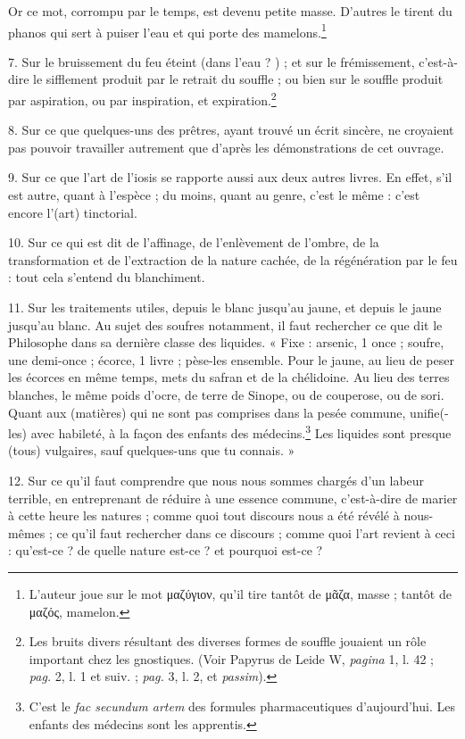 \documentclass[a4paper, 11pt, oneside, polutonikogreek, french]{article}
\begin{document}
Or ce mot, corrompu par le temps, est devenu petite masse. D'autres le tirent du phanos qui sert à puiser l'eau et qui porte des mamelons.\footnote{L'auteur joue sur le mot μαζύγιον, qu'il tire tantôt de μᾶζα, masse ; tantôt de μαζός, mamelon.}

7. Sur le bruissement du feu éteint (dans l'eau ? ) ; et sur le frémissement, c'est-à-dire le sifflement produit par le retrait du souffle ; ou bien sur le souffle produit par aspiration, ou par inspiration, et expiration.\footnote{Les bruits divers résultant des diverses formes de souffle jouaient un rôle important chez les gnostiques. (Voir Papyrus de Leide W, \emph{pagina} 1, l. 42 ; \emph{pag.} 2, l. 1 et suiv. ; \emph{pag.} 3, l. 2, et \emph{passim}).}

8. Sur ce que quelques-uns des prêtres, ayant trouvé un écrit sincère, ne croyaient pas pouvoir travailler autrement que d'après les démonstrations de cet ouvrage.

9. Sur ce que l'art de l'iosis se rapporte aussi aux deux autres livres. En effet, s'il est autre, quant à l'espèce ; du moins, quant au genre, c'est le même : c'est encore l'(art) tinctorial.

10. Sur ce qui est dit de l'affinage, de l'enlèvement de l'ombre, de la transformation et de l'extraction de la nature cachée, de la régénération par le feu : tout cela s'entend du blanchiment.

11. Sur les traitements utiles, depuis le blanc jusqu'au jaune, et depuis le jaune jusqu'au blanc. Au sujet des soufres notamment, il faut rechercher ce que dit le Philosophe dans sa dernière classe des liquides. « Fixe : arsenic, 1 once ; soufre, une demi-once ; écorce, 1 livre ; pèse-les ensemble. Pour le jaune, au lieu de peser les écorces en même temps, mets du safran et de la chélidoine. Au lieu des terres blanches, le même poids d'ocre, de terre de Sinope, ou de couperose, ou de sori. Quant aux (matières) qui ne sont pas comprises dans la pesée commune, unifie(-les) avec habileté, à la façon des enfants des médecins.\footnote{C'est le \emph{fac secundum artem} des formules pharmaceutiques d'aujourd'hui. Les enfants des médecins sont les apprentis.} Les liquides sont presque (tous) vulgaires, sauf quelques-uns que tu connais. »

12. Sur ce qu'il faut comprendre que nous nous sommes chargés d'un labeur terrible, en entreprenant de réduire à une essence commune, c'est-à-dire de marier à cette heure les natures ; comme quoi tout discours nous a été révélé à nous-mêmes ; ce qu'il faut rechercher dans ce discours ; comme quoi l'art revient à ceci : qu'est-ce ? de quelle nature est-ce ? et pourquoi est-ce ?
\end{document}
